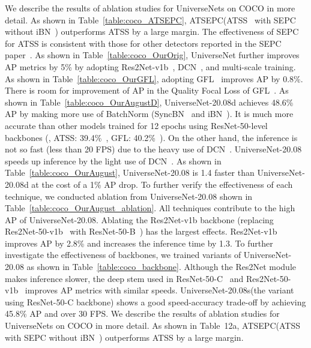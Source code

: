 \documentclass[10pt,twocolumn,letterpaper]{article}
\newcommand{\Univs}{UniverseNets\xspace}
\newcommand{\OurOrig}{UniverseNet\xspace}
\newcommand{\OurAugustD}{UniverseNet-20.08d\xspace}
\newcommand{\OurAugust}{UniverseNet-20.08\xspace}
\newcommand{\OurAugustS}{UniverseNet-20.08s\xspace}
\newcommand{\ATSEPC}{ATSEPC\xspace}
\newcommand{\APS}{AP\xspace}
\begin{document}
\ificcvfinal
We describe the results of ablation studies for \Univs on COCO in more detail.
As shown in Table~\ref{table:coco_ATSEPC}, \ATSEPC (ATSS~\cite{ATSS_CVPR2020} with SEPC without iBN~\cite{SEPC_CVPR2020}) outperforms ATSS by a large margin.
The effectiveness of SEPC for ATSS is consistent with those for other detectors reported in the SEPC paper~\cite{SEPC_CVPR2020}.
As shown in Table~\ref{table:coco_OurOrig}, \OurOrig further improves AP metrics by 5\%
by adopting Res2Net-v1b~\cite{Res2Net_TPAMI2020, Res2Net_PretrainedModels}, DCN~\cite{DCN_ICCV2017}, and multi-scale training.
As shown in Table~\ref{table:coco_OurGFL}, adopting GFL~\cite{GFL_NeurIPS2020} improves AP by 0.8\%.
There is room for improvement of \APS in the Quality Focal Loss of GFL~\cite{GFL_NeurIPS2020}.
As shown in Table~\ref{table:coco_OurAugustD},
\OurAugustD achieves 48.6\% AP by making more use of BatchNorm (SyncBN~\cite{MegDet_CVPR2018} and iBN~\cite{SEPC_CVPR2020}).
It is much more accurate than other models trained for 12 epochs using ResNet-50-level backbones (\eg, ATSS: 39.4\%~\cite{ATSS_CVPR2020, MMDetection}, GFL: 40.2\%~\cite{GFL_NeurIPS2020, MMDetection}).
On the other hand, the inference is not so fast (less than 20 FPS) due to the heavy use of DCN~\cite{DCN_ICCV2017}.
\OurAugust speeds up inference by the light use of DCN~\cite{DCN_ICCV2017, SEPC_CVPR2020}.
As shown in Table~\ref{table:coco_OurAugust},
\OurAugust is 1.4 faster than \OurAugustD at the cost of a 1\% AP drop.
To further verify the effectiveness of each technique, we conducted ablation from \OurAugust shown in Table~\ref{table:coco_OurAugust_ablation}.
All techniques contribute to the high AP of \OurAugust.
Ablating the Res2Net-v1b backbone (replacing Res2Net-50-v1b~\cite{Res2Net_TPAMI2020, Res2Net_PretrainedModels} with ResNet-50-B~\cite{BagOfTricks_Classification_CVPR2019}) has the largest effects.
Res2Net-v1b improves AP by 2.8\% and increases the inference time by 1.3.
To further investigate the effectiveness of backbones, we trained variants of \OurAugust as shown in Table~\ref{table:coco_backbone}.
Although the Res2Net module~\cite{Res2Net_TPAMI2020} makes inference slower,
the deep stem used in ResNet-50-C~\cite{BagOfTricks_Classification_CVPR2019} and Res2Net-50-v1b~\cite{Res2Net_TPAMI2020, Res2Net_PretrainedModels}
improves AP metrics with similar speeds.
\OurAugustS (the variant using ResNet-50-C backbone) shows a good speed-accuracy trade-off by achieving 45.8\% AP and over 30 FPS.
\else
We describe the results of ablation studies for \Univs on COCO in more detail.
As shown in Table~12a, \ATSEPC (ATSS~\cite{ATSS_CVPR2020} with SEPC without iBN~\cite{SEPC_CVPR2020}) outperforms ATSS by a large margin.
\end{document}
